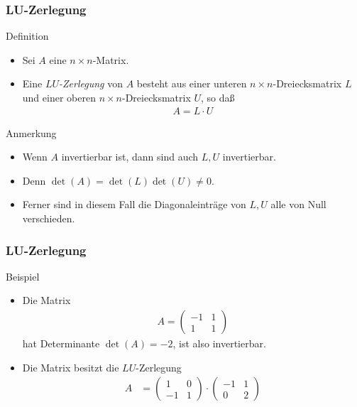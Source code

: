 \documentclass{beamer}
\renewcommand{\emph}[1]{{\textcolor{solarizedRed}{\itshape #1}}}
\renewcommand{\ae}{\"a}
\newcommand{\mytitle}{LU-Zerlegung}
\begin{document}
\begin{frame}\frametitle{\mytitle}
	\begin{block}{Definition}
		\begin{itemize}
			\item Sei $A$ eine $n\times n$-Matrix.
			\item Eine \emph{$LU$-Zerlegung} von $A$ besteht aus einer unteren $n\times n$-Dreiecksmatrix $L$ und einer oberen $n\times n$-Dreiecksmatrix $U$, so da\ss
				\begin{align*}
				A=L\cdot U
				\end{align*}
		\end{itemize}
	\end{block}
\begin{block}{Anmerkung}
		\begin{itemize}
			\item Wenn $A$ invertierbar ist, dann sind auch $L,U$ invertierbar.
			\item Denn $\det(A)=\det(L)\det(U)\neq0$.
			\item Ferner sind in diesem Fall die Diagonaleintr\ae ge von $L,U$ alle von Null verschieden.
		\end{itemize}
	\end{block}
\end{frame}

\begin{frame}\frametitle{\mytitle}
	\begin{block}{Beispiel}
		\begin{itemize}
			\item Die Matrix
				\begin{align*}
					A=\begin{pmatrix} -1&1\\1&1 \end{pmatrix}
				\end{align*}
				hat Determinante $\det(A)=-2$, ist also invertierbar.
			\item Die Matrix besitzt die $LU$-Zerlegung
				\begin{align*}
					A&=\begin{pmatrix} 1&0\\-1&1 \end{pmatrix}\cdot\begin{pmatrix} -1&1\\0&2 \end{pmatrix}
				\end{align*}
		\end{itemize}
	\end{block}
\end{frame}
\end{document}
